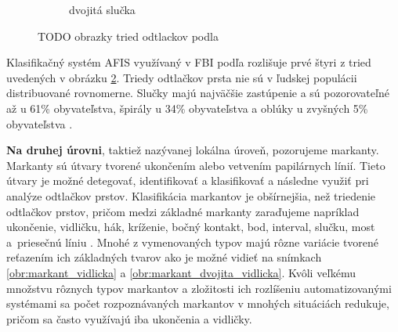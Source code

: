 \begin{figure}[h]
\begin{subfigure}[b]{0.32\linewidth}
      \caption{dvojitá slučka}
      \label{obr:triedy_odtlackov/dvojita_slucka}
    \end{subfigure}
    \caption{TODO obrazky tried odtlackov podla \cite{Henry}} %
    \label{obr:triedy_odtlackov}
  \end{figure}

  Klasifikačný systém AFIS využívaný v FBI podľa \cite{FingerprintSrcBook} rozlišuje prvé štyri z tried uvedených v obrázku \ref{obr:triedy_odtlackov}.
  Triedy odtlačkov prsta nie sú v ľudskej populácii distribuované rovnomerne.
  Slučky majú najväčšie zastúpenie a sú pozorovateľné až u 61\% obyvateľstva, špirály u 34\% obyvateľstva a oblúky u zvyšných
  5\% obyvateľstva \cite{sciencing}.

  \textbf{Na druhej úrovni}, taktiež nazývanej lokálna úroveň, pozorujeme markanty. Markanty sú útvary tvorené ukončením alebo
  vetvením papilárnych línií. Tieto útvary je možné detegovať, identifikovať a klasifikovať a následne využiť pri analýze odtlačkov prstov.
  Klasifikácia markantov je obšírnejšia, než triedenie odtlačkov prstov, pričom medzi základné markanty zaraďujeme napríklad
  ukončenie, vidličku, hák, kríženie, bočný kontakt, bod, interval, slučku, most a~priesečnú líniu \cite{Drahansky}. Mnohé z vymenovaných typov majú rôzne
  variácie tvorené reťazením ich základných tvarov ako je možné vidieť na snímkach \ref{obr:markant_vidlicka} a \ref{obr:markant_dvojita_vidlicka}.
  Kvôli veľkému množstvu rôznych typov markantov a zložitosti ich rozlíšeniu automatizovanými systémami sa počet rozpoznávaných markantov v mnohých
  situáciách redukuje, pričom sa často využívajú iba ukončenia a vidličky.

